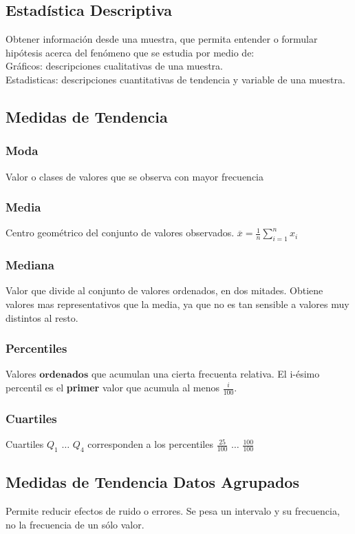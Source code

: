 \subsection{Estad\'istica Descriptiva}
Obtener informaci\'on desde una muestra, que permita entender o formular hip\'otesis acerca del fen\'omeno que se estudia por medio de:\\
Gr\'aficos: descripciones cualitativas de una muestra.\\
Estadisticas: descripciones cuantitativas de tendencia y variable de una muestra.\\

\subsection{Medidas de Tendencia}

\subsubsection{Moda}
Valor o clases de valores que se observa con mayor frecuencia
\subsubsection{Media}
Centro geom\'etrico del conjunto de valores observados.
$\overline{x} = \frac{1}{n} \sum_{i=1}^n x_i$
\subsubsection{Mediana} Valor que divide al conjunto de valores ordenados, en dos mitades. Obtiene valores mas representativos que la media, ya que no es tan sensible a valores muy distintos al resto.

\subsubsection{Percentiles}
Valores $\textbf{ordenados}$ que acumulan una cierta frecuenta relativa. El i-\'esimo percentil es el \textbf{primer} valor que acumula al menos $\frac{i}{100}$.

\subsubsection{Cuartiles}
Cuartiles $Q_1$ $\ldots$ $Q_4$ corresponden a los percentiles $\frac{25}{100}$ $\ldots$ $\frac{100}{100}$

\subsection{Medidas de Tendencia Datos Agrupados}
Permite reducir efectos de ruido o errores. Se pesa un intervalo y su frecuencia, no la frecuencia de un s\'olo valor.

